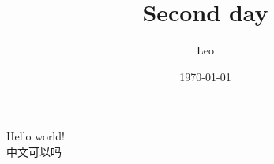 \documentclass{article}        %
\title{Second day}
\author{Leo}
\date{\today}
\begin{document}
\maketitle
Hello world! \\
中文可以吗
\end{document}
